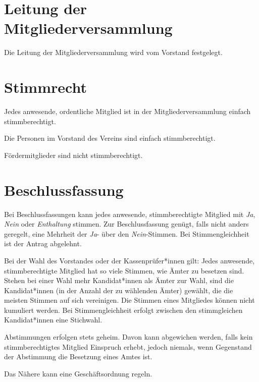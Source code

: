 \section{Leitung der Mitgliederversammlung}
Die Leitung der Mitgliederversammlung wird vom Vorstand festgelegt.

\section{Stimmrecht}
\begin{absätze}
    \item Jedes anwesende, ordentliche Mitglied ist in der Mitgliederversammlung einfach stimmberechtigt.
    \item Die Personen im Vorstand des Vereins sind einfach stimmberechtigt.
    \item Fördermitglieder sind nicht stimmberechtigt.
\end{absätze}

\section{Beschlussfassung}
\begin{absätze}
    \item Bei Beschlussfassungen kann jedes anwesende, stimmberechtigte Mitglied mit \textit{Ja}, \textit{Nein} oder \textit{Enthaltung} stimmen. Zur Beschlussfassung genügt, falls nicht anders geregelt, eine Mehrheit der \textit{Ja}- über den \textit{Nein}-Stimmen. Bei Stimmengleichheit ist der Antrag abgelehnt.
    \item Bei der Wahl des Vorstandes oder der Kassenprüfer*innen gilt: Jedes anwesende, stimmberechtigte Mitglied hat so viele Stimmen, wie Ämter zu besetzen sind. Stehen bei einer Wahl mehr Kandidat*innen als Ämter zur Wahl, sind die Kandidat*innen (in der Anzahl der zu wählenden Ämter) gewählt, die die meisten Stimmen auf sich vereinigen. Die Stimmen eines Mitgliedes können nicht kumuliert werden. Bei Stimmengleichheit erfolgt zwischen den stimmgleichen Kandidat*innen eine Stichwahl. 
    \item Abstimmungen erfolgen stets geheim. Davon kann abgewichen werden, falls kein stimmberechtigtes Mitglied Einspruch erhebt, jedoch niemals, wenn Gegenstand der Abstimmung die Besetzung eines Amtes ist.
    \item Das Nähere kann eine Geschäftsordnung regeln.
\end{absätze}

